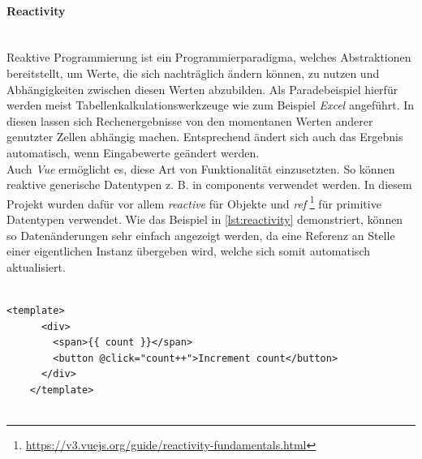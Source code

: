 \documentclass[10pt, a4paper]{article}
\begin{document}
\begin{onehalfspace}
  \paragraph*{Reactivity}$~$ \\
  Reaktive Programmierung ist ein Programmierparadigma, welches Abstraktionen bereitstellt,
  um Werte, die sich nachträglich ändern können, zu nutzen
  und Abhängigkeiten zwischen diesen Werten abzubilden.\cite{ReactiveProgramming}
  Als Paradebeispiel hierfür werden meist Tabellenkalkulationswerkzeuge wie zum Beispiel \textit{Excel} angeführt.
  In diesen lassen sich Rechenergebnisse von den momentanen Werten anderer genutzter Zellen abhängig machen.
  Entsprechend ändert sich auch das Ergebnis automatisch, wenn Eingabewerte geändert werden. \\
  Auch \textit{Vue} ermöglicht es, diese Art von Funktionalität einzusetzten.
  So können reaktive generische Datentypen z. B. in components verwendet werden.
  In diesem Projekt wurden dafür vor allem \textit{reactive} für Objekte und \textit{ref}
    \footnote{\raggedright\url{https://v3.vuejs.org/guide/reactivity-fundamentals.html}} für primitive Datentypen verwendet.
  Wie das Beispiel in \autoref{lst:reactivity} demonstriert, können so Datenänderungen sehr einfach angezeigt werden, da eine Referenz an Stelle einer eigentlichen Instanz übergeben wird, welche sich somit automatisch aktualisiert.
  \\~\\
  \begin{minipage}{\textwidth}
    \begin{lstlisting}[caption={Demonstration reaktivier Vue-Referenzen}, captionpos=b, label=lst:reactivity]
      <template>
      <div>
        <span>{{ count }}</span>
        <button @click="count++">Increment count</button>
      </div>
    </template>


\end{lstlisting}
\end{minipage}
\end{onehalfspace}
\end{document}
